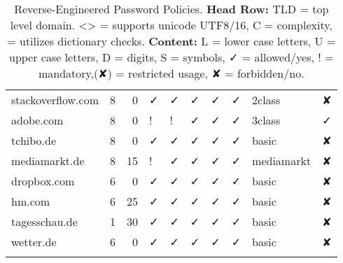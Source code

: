 {\begin{longtable}{lrrlllllll}
		stackoverflow.com & 8     & 0     & ✓ & ✓ & ✓ & ✓ & ✓ & 2class & ✘\\
		adobe.com & 8     & 0     & ! & ! & ✓ & ✓ & ✓ & 3class & ✓\\
		tchibo.de & 8     & 0     & ✓ & ✓ & ✓ & ✓ & ✓ & basic & ✘\\
		mediamarkt.de & 8     & 15    & ! & ✓ & ✓ & ✓ & ✓ & mediamarkt & ✘\\
		dropbox.com & 6     & 0     & ✓ & ✓ & ✓ & ✓ & ✓ & basic & ✘\\
		hm.com & 6     & 25    & ✓ & ✓ & ✓ & ✓ & ✓ & basic & ✘\\
		tagesschau.de & 1     & 30    & ✓ & ✓ & ✓ & ✓ & ✓ & basic & ✘\\
		wetter.de & 6     & 0     & ✓ & ✓ & ✓ & ✓ & ✓ & basic & ✘\\
		\caption{\label{tab:appendix:policies} Reverse-Engineered Password Policies. \textbf{Head Row:} TLD = top level domain. <> = supports unicode UTF8/16, C = complexity, \emoji{1F4D6} = utilizes dictionary checks. \textbf{Content:} L = lower case letters, U = upper case letters, D = digits, S = symbols, ✓ = allowed/yes, ! = mandatory,(✘) = restricted usage, ✘ = forbidden/no.}
	\end{longtable}%
}%
\clearpage